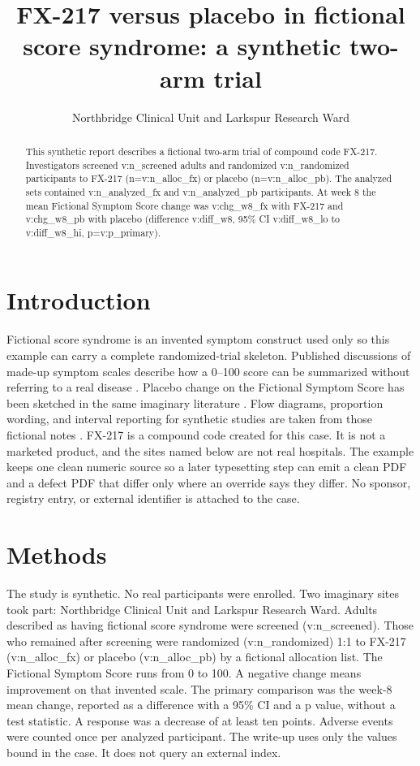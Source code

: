 \documentclass[11pt]{article}
\begin{document}
\title{FX-217 versus placebo in fictional score syndrome: a synthetic two-arm trial}
\author{Northbridge Clinical Unit and Larkspur Research Ward}
\maketitle
\begin{abstract}
This synthetic report describes a fictional two-arm trial of compound code FX-217.
Investigators screened {{v:n_screened}} adults and randomized {{v:n_randomized}}
participants to FX-217 (n={{v:n_alloc_fx}}) or placebo (n={{v:n_alloc_pb}}).
The analyzed sets contained {{v:n_analyzed_fx}} and {{v:n_analyzed_pb}} participants.
At week 8 the mean Fictional Symptom Score change was {{v:chg_w8_fx}} with FX-217 and
{{v:chg_w8_pb}} with placebo (difference {{v:diff_w8}}, 95\% CI {{v:diff_w8_lo}} to
{{v:diff_w8_hi}}, p={{v:p_primary}}).
\end{abstract}
\section{Introduction}
Fictional score syndrome is an invented symptom construct used only so this example can carry a complete randomized-trial skeleton.
Published discussions of made-up symptom scales describe how a 0--100 score can be summarized without referring to a real disease \cite{hale2018,okonkwo2020}.
Placebo change on the Fictional Symptom Score has been sketched in the same imaginary literature \cite{brant2021}.
Flow diagrams, proportion wording, and interval reporting for synthetic studies are taken from those fictional notes \cite{voss2019,chen2022,ibrahim2017}.
FX-217 is a compound code created for this case. It is not a marketed product, and the sites named below are not real hospitals.
The example keeps one clean numeric source so a later typesetting step can emit a clean PDF and a defect PDF that differ only where an override says they differ.
No sponsor, registry entry, or external identifier is attached to the case.
\section{Methods}
The study is synthetic. No real participants were enrolled.
Two imaginary sites took part: Northbridge Clinical Unit and Larkspur Research Ward.
Adults described as having fictional score syndrome were screened ({{v:n_screened}}).
Those who remained after screening were randomized ({{v:n_randomized}}) 1:1 to FX-217 ({{v:n_alloc_fx}}) or placebo ({{v:n_alloc_pb}}) by a fictional allocation list.
The Fictional Symptom Score runs from 0 to 100. A negative change means improvement on that invented scale.
The primary comparison was the week-8 mean change, reported as a difference with a 95\% CI and a p value, without a test statistic.
A response was a decrease of at least ten points. Adverse events were counted once per analyzed participant.
The write-up uses only the values bound in the case. It does not query an external index.
\end{document}
